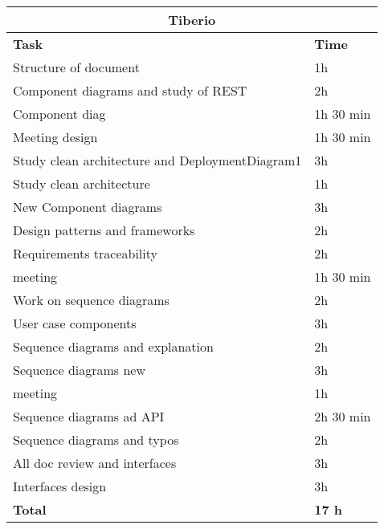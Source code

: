 \begin{table}[H]
\begin{tabular}{|l|l|}
\hline
\multicolumn{2}{|c|}{\textbf{Tiberio}}            \\ \hline
\textbf{Task}                   & \textbf{Time} \\ \hline
Structure of document                & 1h      \\ \hline
Component diagrams and study of REST       & 2h      \\ \hline
Component diag & 1h 30 min \\ \hline
Meeting design & 1h 30 min \\ \hline
Study clean architecture and DeploymentDiagram1 & 3h \\ \hline
Study clean architecture & 1h \\ \hline
New Component diagrams & 3h \\ \hline
Design patterns and frameworks & 2h \\ \hline
Requirements traceability & 2h \\ \hline
meeting & 1h 30 min \\ \hline
Work on sequence diagrams & 2h \\ \hline
User case components & 3h \\ \hline
Sequence diagrams and explanation & 2h \\ \hline
Sequence diagrams new & 3h \\ \hline
meeting & 1h \\ \hline
Sequence diagrams ad API & 2h 30 min \\ \hline
Sequence diagrams and typos & 2h \\ \hline
All doc review and interfaces & 3h \\ \hline
Interfaces design & 3h \\ \hline 
\rowcolor {polilight}
\textbf{Total}                  & \textbf{17 h}   \\ \hline
\end{tabular}
\end{table}


